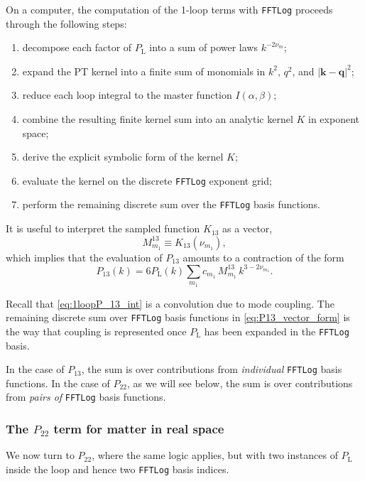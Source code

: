 \documentclass[a4paper,11pt]{article}
\newcommand{\codefont}[1]{{\texttt{#1}}}
\def\Plin{P_{\rm L}}
\renewcommand{\emph}[1]{\textit{#1}}
\newcommand{\<}{\langle}
\renewcommand{\>}{\rangle}
\def\Plin{P_\text{L}}
\begin{document}
On a computer, the computation of the 1-loop terms with \codefont{FFTLog} proceeds through the following steps:
\begin{enumerate}
\item decompose each factor of \(\Plin\) into a sum of power laws \(k^{-2\nu_m}\);
\item expand the PT kernel into a finite sum of monomials in \(k^2\), \(q^2\), and \(|\mathbf k-\mathbf q|^2\);
\item reduce each loop integral to the master function \(I(\alpha,\beta)\);
\item combine the resulting finite kernel sum into an analytic kernel \(K\) in exponent space;
\item derive the explicit symbolic form of the kernel \(K\);
\item evaluate the kernel on the discrete \codefont{FFTLog} exponent grid;
\item perform the remaining discrete sum over the \codefont{FFTLog} basis functions.
\end{enumerate}

It is useful to interpret the sampled function \(K_{13}\) as a vector,
\begin{equation}
M_{m_1}^{13}\equiv K_{13}(\nu_{m_1}),
\label{eq:M13}
\end{equation}
which implies that the evaluation of \(P_{13}\) amounts to a contraction of the form
\begin{equation}
P_{13}(k)=6 \Plin(k)\sum_{m_1}c_{m_1}\,M_{m_1}^{13}\,k^{3-2\nu_{m_1}}.
\label{eq:P13_vector_form}
\end{equation}

Recall that \cref{eq:1loopP_13_int} is a convolution due to mode coupling. The remaining discrete sum over \codefont{FFTLog} basis functions in \cref{eq:P13_vector_form} is the way that coupling is represented once \(\Plin\) has been expanded in the \codefont{FFTLog} basis.

In the case of \(P_{13}\), the sum is over contributions from \emph{individual} \codefont{FFTLog} basis functions. In the case of \(P_{22}\), as we will see below, the sum is over contributions from \emph{pairs of} \codefont{FFTLog} basis functions.

\subsubsection{The \(P_{22}\) term for matter in real space}

We now turn to \(P_{22}\), where the same logic applies, but with two instances of \(\Plin\) inside the loop and hence two \codefont{FFTLog} basis indices.
\end{document}
